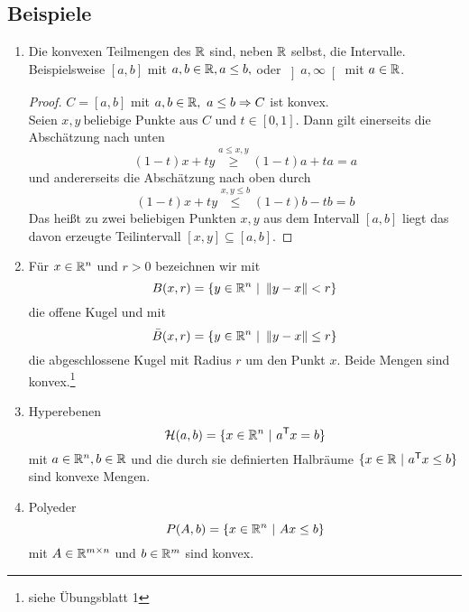 \subsection{Beispiele}
\begin{enumerate}[label=\emph{\alph*})]
	\item Die konvexen Teilmengen des $\mathbb R$ sind, neben $\mathbb R$ selbst, die Intervalle. Beispielsweise $\left[a,b \right]$ mit $a,b\in\mathbb R,a\leq b,$ oder $\left]a,\infty\right[$ mit $a\in\mathbb R$.
	\begin{proof}
	$C=\left[a,b \right]$ mit $a,b\in\mathbb R,~a\leq b \Rightarrow C$ ist konvex.\\
	Seien $x,y ~\text{beliebige Punkte aus } C \text{ und } t\in\left[0,1 \right]$. Dann gilt einerseits die Absch\"atzung nach unten
	\begin{equation*}
		(1-t)x+ty \stackrel{a \leq x,y}{\geq} (1-t)a+ta = a
	\end{equation*}
	 und andererseits die Absch\"atzung nach oben durch 
	 \begin{equation*}
		(1-t)x+ty \stackrel{x,y\leq b}{\leq} (1-t)b-tb=b
	 \end{equation*}
	 Das hei\ss t zu zwei beliebigen Punkten $x,y$ aus dem Intervall $\left[a,b \right]$ liegt das davon erzeugte Teilintervall $\left[x,y\right]\subseteq \left[a,b\right]$.
	\end{proof}
	\item F\"ur $x\in\mathbb R^n$ und $r>0$ bezeichnen wir mit
	\begin{equation*}
		B(x,r)=\lbrace y\in\mathbb R^n ~\vert~ \left\lVert y-x\right\rVert <r\rbrace
	\end{equation*}
	die offene Kugel und mit
		\begin{equation*}
	\bar{B}(x,r)=\lbrace y\in\mathbb R^n ~\vert~ \left\lVert y-x\right\rVert \leq r\rbrace
	\end{equation*}
	die abgeschlossene Kugel mit Radius $r$ um den Punkt $x$. Beide Mengen sind konvex.\footnote{siehe Übungsblatt 1}
	\item Hyperebenen
	\begin{equation*}
		\mathcal{H}(a,b)=\lbrace x\in\mathbb R^n ~\vert~ a^\mathsf{T} x=b \rbrace
	\end{equation*}
	mit $a\in\mathbb R^n,b\in \mathbb R$ und die durch sie definierten Halbr\"aume $\lbrace x\in\mathbb R ~\vert~ a^\mathsf{T} x\leq b \rbrace$ sind konvexe Mengen.
	\item Polyeder
	\begin{equation*}
	P(A,b)=\lbrace x\in\mathbb R^n ~\vert~ Ax\leq b \rbrace
	\end{equation*}
	mit $A\in\mathbb R^{m\times n}$ und $b\in\mathbb R^m$ sind konvex.

\end{enumerate}
